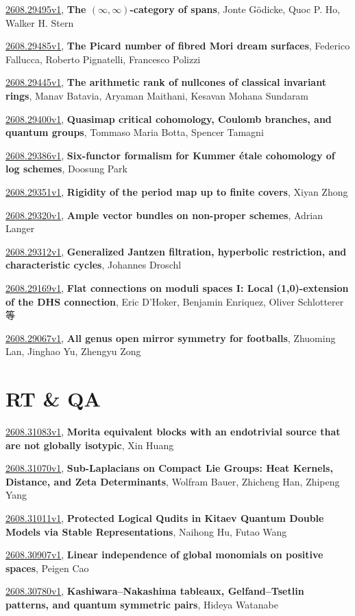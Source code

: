 \documentclass[9pt, a4paper]{article}
\theoremstyle{plain}
\theoremstyle{definition}
\theoremstyle{remark}
\newcommand{\arxiv}[3]{\href{https://arxiv.org/abs/#1}{#1}, \textbf{\textcolor{arxivblue}{#2}}, #3}
\begin{document}
\arxiv{2608.29495v1}{The $(\infty,\infty)$-category of spans}{Jonte Gödicke, Quoc P. Ho, Walker H. Stern}

\arxiv{2608.29485v1}{The Picard number of fibred Mori dream surfaces}{Federico Fallucca, Roberto Pignatelli, Francesco Polizzi}

\arxiv{2608.29445v1}{The arithmetic rank of nullcones of classical invariant rings}{Manav Batavia, Aryaman Maithani, Kesavan Mohana Sundaram}

\arxiv{2608.29400v1}{Quasimap critical cohomology, Coulomb branches, and quantum groups}{Tommaso Maria Botta, Spencer Tamagni}

\arxiv{2608.29386v1}{Six-functor formalism for Kummer étale cohomology of log schemes}{Doosung Park}

\arxiv{2608.29351v1}{Rigidity of the period map up to finite covers}{Xiyan Zhong}

\arxiv{2608.29320v1}{Ample vector bundles on non-proper schemes}{Adrian Langer}

\arxiv{2608.29312v1}{Generalized Jantzen filtration, hyperbolic restriction, and characteristic cycles}{Johannes Droschl}

\arxiv{2608.29169v1}{Flat connections on moduli spaces I: Local (1,0)-extension of the DHS connection}{Eric D'Hoker, Benjamin Enriquez, Oliver Schlotterer 等}

\arxiv{2608.29067v1}{All genus open mirror symmetry for footballs}{Zhuoming Lan, Jinghao Yu, Zhengyu Zong}


\section{RT \& QA}
\arxiv{2608.31083v1}{Morita equivalent blocks with an endotrivial source that are not globally isotypic}{Xin Huang}

\arxiv{2608.31070v1}{Sub-Laplacians on Compact Lie Groups: Heat Kernels, Distance, and Zeta Determinants}{Wolfram Bauer, Zhicheng Han, Zhipeng Yang}

\arxiv{2608.31011v1}{Protected Logical Qudits in Kitaev Quantum Double Models via Stable Representations}{Naihong Hu, Futao Wang}

\arxiv{2608.30907v1}{Linear independence of global monomials on positive spaces}{Peigen Cao}

\arxiv{2608.30780v1}{Kashiwara--Nakashima tableaux, Gelfand--Tsetlin patterns, and quantum symmetric pairs}{Hideya Watanabe}
\end{document}
